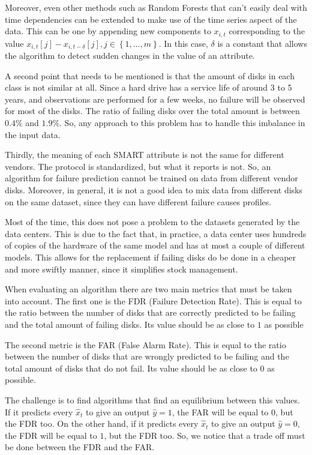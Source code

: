 Moreover, even other methods such as Random Forests that can't easily deal with time dependencies can be extended to make use of the time series aspect of the data.
This can be one by appending new components to $x_{i,t}$ corresponding to the value $x_{i,t}[j] - x_{i,t-\delta}[j], j\in\left\{1,\dots,m\right\}$.
In this case, $\delta$ is a constant that allows the algorithm to detect sudden changes in the value of an attribute\cite{Shen18}.

A second point that needs to be mentioned is that the amount of disks in each class is not similar at all.
Since a hard drive has a service life of around 3 to 5 years\cite{Vishwanath10}, and observations are performed for a few weeks, no failure will be observed for most of the disks.
The ratio of failing disks over the total amount is between $0.4\%$ and $1.9\%$\cite{Xu16}.
So, any approach to this problem has to handle this imbalance in the input data.

Thirdly, the meaning of each SMART attribute is not the same for different vendors\cite{SamsungSSD}.
The protocol is standardized, but what it reports is not.
So, an algorithm for failure prediction cannot be trained on data from different vendor disks.
Moreover, in general, it is not a good idea to mix data from different disks on the same dataset, since they can have different failure causes profiles.

Most of the time, this does not pose a problem to the datasets generated by the data centers.
This is due to the fact that, in practice, a data center uses hundreds of copies of the hardware of the same model and has at most a couple of different models.
This allows for the replacement if failing disks do be done in a cheaper and more swiftly manner, since it simplifies stock management.

When evaluating an algorithm there are two main metrics that must be taken into account.
The first one is the FDR (Failure Detection Rate).
This is equal to the ratio between the number of disks that are correctly predicted to be failing and the total amount of failing disks.
Its value should be as close to $1$ as possible

The second metric is the FAR (False Alarm Rate).
This is equal to the ratio between the number of disks that are wrongly predicted to be failing and the total amount of disks that do not fail.
Its value should be as close to $0$ as possible.

The challenge is to find algorithms that find an equilibrium between this values.
If it predicts every $\hat{x}_t$ to give an output $\hat{y} = 1$, the FAR will be equal to $0$, but the FDR too.
On the other hand, if it predicts every $\hat{x}_t$ to give an output $\hat{y} = 0$, the FDR will be equal to $1$, but the FDR too.
So, we notice that a trade off must be done between the FDR and the FAR.

